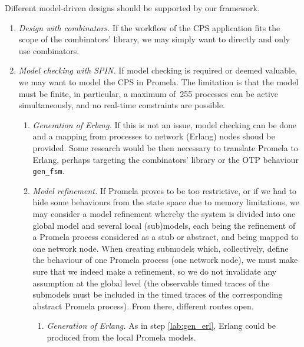 \documentclass[a4paper,11pt,twoside]{article}
\newcommand\SPIN{\textsf{SPIN}\xspace}
\newcommand\Promela{\textsf{Promela}\xspace}
\newcommand\Erlang{\textsf{Erlang}\xspace}
\begin{document}
Different model\hyp{}driven designs should be supported by our
framework.
\begin{enumerate}

  \item \emph{Design with combinators.} If the workflow of the CPS
    application fits the scope of the combinators' library, we may
    simply want to directly and only use combinators.

  \item \emph{Model checking with \SPIN.} If model checking is
    required or deemed valuable, we may want to model the CPS in
    \Promela. The limitation is that the model must be finite, in
    particular, a maximum of~255 processes can be active
    simultaneously, and no real\hyp{}time constraints are possible.
    \begin{enumerate}

      \item \label{lab:gen_erl} \emph{Generation of \Erlang.} If this
        is not an issue, model checking can be done and a mapping from
        processes to network (\Erlang) nodes shoud be provided. Some
        research would be then necessary to translate \Promela to
        \Erlang, perhaps targeting the combinators' library or the
        \textsf{OTP} behaviour \texttt{gen\_fsm}.

      \item \emph{Model refinement.} If \Promela proves to be too
        restrictive, or if we had to hide some behaviours from the
        state space due to memory limitations, we may consider a model
        refinement whereby the system is divided into one global model
        and several local (sub)models, each being the refinement of a
        \Promela process considered as a stub or abstract, and being
        mapped to one network node. When creating submodels which,
        collectively, define the behaviour of one \Promela process
        (one network node), we must make sure that we indeed make a
        refinement, so we do not invalidate any assumption at the
        global level (the observable timed traces of the submodels
        must be included in the timed traces of the corresponding
        abstract \Promela process). From there, different routes open.
        \begin{enumerate}

          \item \emph{Generation of \Erlang.} As in step
            \ref{lab:gen_erl}, \Erlang could be produced from the
            local \Promela models.


\end{enumerate}
\end{enumerate}
\end{enumerate}
\end{document}
